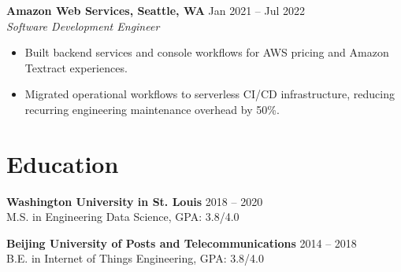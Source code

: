 \documentclass[letterpaper,10pt]{article}
\newcommand{\cventry}[3]{%
  \textbf{#1} \hfill #2\\
  \textit{#3}
}
\begin{document}
\cventry{Amazon Web Services, Seattle, WA}{Jan 2021 -- Jul 2022}{Software Development Engineer}
\begin{itemize}
  \item Built backend services and console workflows for AWS pricing and Amazon Textract experiences.
  \item Migrated operational workflows to serverless CI/CD infrastructure, reducing recurring engineering maintenance overhead by 50\%.
\end{itemize}

\section*{Education}

\textbf{Washington University in St. Louis} \hfill 2018 -- 2020\\
M.S. in Engineering Data Science, GPA: 3.8/4.0

\textbf{Beijing University of Posts and Telecommunications} \hfill 2014 -- 2018\\
B.E. in Internet of Things Engineering, GPA: 3.8/4.0
\end{document}
